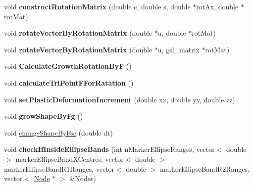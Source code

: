 \begin{DoxyCompactItemize}
\item 
\hypertarget{classShapeBase_ac5ea30d81c19c9f7c904af66310c750b}{}void {\bfseries construct\+Rotation\+Matrix} (double c, double s, double $\ast$rot\+Ax, double $\ast$rot\+Mat)\label{classShapeBase_ac5ea30d81c19c9f7c904af66310c750b}

\item 
\hypertarget{classShapeBase_ad803a237b7e7c06d419a308625a599e0}{}void {\bfseries rotate\+Vector\+By\+Rotation\+Matrix} (double $\ast$u, double $\ast$rot\+Mat)\label{classShapeBase_ad803a237b7e7c06d419a308625a599e0}

\item 
\hypertarget{classShapeBase_a14a573072213ea91314c8f1101f106bb}{}void {\bfseries rotate\+Vector\+By\+Rotation\+Matrix} (double $\ast$u, gsl\+\_\+matrix $\ast$rot\+Mat)\label{classShapeBase_a14a573072213ea91314c8f1101f106bb}

\item 
\hypertarget{classShapeBase_a9ae4c5fc8817528493502e3f75c9a984}{}void {\bfseries Calculate\+Growth\+Rotation\+By\+F} ()\label{classShapeBase_a9ae4c5fc8817528493502e3f75c9a984}

\item 
\hypertarget{classShapeBase_a5f5e95f38f271d28f2856109b0256aa0}{}void {\bfseries calculate\+Tri\+Point\+F\+For\+Ratation} ()\label{classShapeBase_a5f5e95f38f271d28f2856109b0256aa0}

\item 
\hypertarget{classShapeBase_aa36cea09cbf418a9e37454016c5b3f30}{}void {\bfseries set\+Plastic\+Deformation\+Increment} (double xx, double yy, double zz)\label{classShapeBase_aa36cea09cbf418a9e37454016c5b3f30}

\item 
\hypertarget{classShapeBase_a29ee0eeca30fdd381d294b383c3baf0c}{}void {\bfseries grow\+Shape\+By\+Fg} ()\label{classShapeBase_a29ee0eeca30fdd381d294b383c3baf0c}

\item 
void \hyperlink{classShapeBase_a5409de18ee9e47af0bb977f4a1e608fb}{change\+Shape\+By\+Fsc} (double dt)
\item 
\hypertarget{classShapeBase_aaed6b74cc2bdab11f7691ef3d99c3e32}{}void {\bfseries check\+If\+Inside\+Ellipse\+Bands} (int n\+Marker\+Ellipse\+Ranges, vector$<$ double $>$ marker\+Ellipse\+Band\+X\+Centres, vector$<$ double $>$ marker\+Ellipse\+Band\+R1\+Ranges, vector$<$ double $>$ marker\+Ellipse\+Band\+R2\+Ranges, vector$<$ \hyperlink{classNode}{Node} $\ast$ $>$ \&Nodes)\label{classShapeBase_aaed6b74cc2bdab11f7691ef3d99c3e32}


\end{DoxyCompactItemize}
